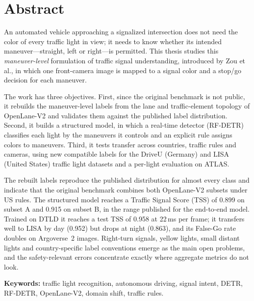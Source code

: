 \chapter*{Abstract}

An automated vehicle approaching a signalized intersection does not need the color of every traffic
light in view; it needs to know whether its intended maneuver---straight, left or right---is
permitted. This thesis studies this \emph{maneuver-level} formulation of traffic signal understanding,
introduced by Zou et al., in which one front-camera image is mapped to a signal color and a stop/go
decision for each maneuver.

The work has three objectives. First, since the original benchmark is not public, it rebuilds the
maneuver-level labels from the lane and traffic-element topology of OpenLane-V2 and validates them
against the published label distribution. Second, it builds a structured model, in which a real-time
detector (RF-DETR) classifies each light by the maneuvers it controls and an explicit rule assigns colors
to maneuvers. Third, it tests transfer across countries, traffic rules and cameras, using new compatible
labels for the DriveU (Germany) and LISA (United States) traffic light datasets and a per-light
evaluation on ATLAS.

The rebuilt labels reproduce the published distribution for almost every class and indicate that the
original benchmark combines both OpenLane-V2 subsets under US rules. The structured model reaches a
Traffic Signal Score (TSS) of 0.899 on subset A and 0.915 on subset B, in the range published for the
end-to-end model. Trained on DTLD it reaches a test TSS of 0.958 at 22\,ms per frame; it transfers well
to LISA by day (0.952) but drops at night (0.863), and its False-Go rate doubles on Argoverse~2 images.
Right-turn signals, yellow lights, small distant lights and country-specific label conventions emerge
as the main open problems, and the safety-relevant errors concentrate exactly where aggregate metrics
do not look.

\vspace{0.5cm}
\noindent\textbf{Keywords:} traffic light recognition, autonomous driving, signal intent, DETR,
RF-DETR, OpenLane-V2, domain shift, traffic rules.
